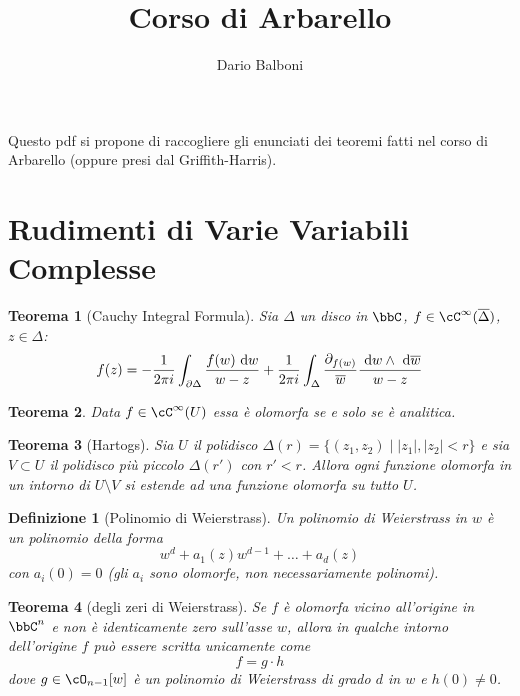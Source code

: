 \documentclass[a4paper,11pt]{article}
\title{Corso di Arbarello}
\author{Dario Balboni}
\date{}
\newtheorem{teorema}{Teorema}
\newtheorem{definizione}{Definizione}
\begin{document}
\maketitle

Questo pdf si propone di raccogliere gli enunciati dei teoremi fatti nel corso di Arbarello (oppure presi dal Griffith-Harris).

\section{Rudimenti di Varie Variabili Complesse}
\begin{teorema}[Cauchy Integral Formula]
  Sia $\Delta$ un disco in $\bbC$, $f \in \cC^\infty (\overline\Delta)$, $z \in \Delta$:
  $$ f(z) = -\frac{1}{2\pi i} \int_{\partial\Delta} \frac{f(w) \de w}{w - z} + \frac{1}{2\pi i} \int_\Delta \frac{\dpar{f(w)}}{\overline{w}} \frac{\de w \wedge \de \overline{w}}{w - z} $$
\end{teorema}


\begin{teorema}
  Data $f \in \cC^\infty(U)$ essa è olomorfa se e solo se è analitica.
\end{teorema}

\begin{teorema}[Hartogs]
  Sia $U$ il polidisco $\Delta(r) = \{ (z_1, z_2) \mid |z_1|, |z_2| < r \}$ e sia $V \subset U$ il polidisco più piccolo $\Delta(r')$ con $r' < r$.
  Allora ogni funzione olomorfa in un intorno di $U \setminus V$ si estende ad una funzione olomorfa su tutto $U$.
\end{teorema}

\begin{definizione}[Polinomio di Weierstrass]
  Un polinomio di Weierstrass in $w$ è un polinomio della forma
  $$ w^d + a_1(z) w^{d-1} + \ldots + a_d(z) $$
  con $a_i(0) = 0$ (gli $a_i$ sono olomorfe, non necessariamente polinomi).
\end{definizione}

\begin{teorema}[degli zeri di Weierstrass]
  Se $f$ è olomorfa vicino all'origine in $\bbC^n$ e non è identicamente zero sull'asse $w$, allora in qualche intorno dell'origine $f$ può essere scritta unicamente come
  $$ f = g \cdot h $$
  dove $g \in \cO_{n-1}[w]$ è un polinomio di Weierstrass di grado $d$ in $w$ e $h(0) \neq 0$.
\end{teorema}
\end{document}
